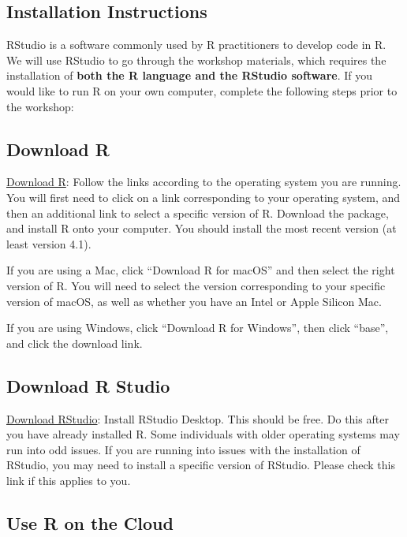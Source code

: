 \documentclass[
]{article}
\begin{document}
\hypertarget{installation-instructions}{%
\subsection{Installation Instructions}\label{installation-instructions}}

RStudio is a software commonly used by R practitioners to develop code
in R. We will use RStudio to go through the workshop materials, which
requires the installation of \textbf{both the R language and the RStudio
software}. If you would like to run R on your own computer, complete the
following steps prior to the workshop:

\hypertarget{download-r}{%
\subsection{Download R}\label{download-r}}

\href{https://cloud.r-project.org/}{Download R}: Follow the links
according to the operating system you are running. You will first need
to click on a link corresponding to your operating system, and then an
additional link to select a specific version of R. Download the package,
and install R onto your computer. You should install the most recent
version (at least version 4.1).

If you are using a Mac, click ``Download R for macOS'' and then select
the right version of R. You will need to select the version
corresponding to your specific version of macOS, as well as whether you
have an Intel or Apple Silicon Mac.

If you are using Windows, click ``Download R for Windows'', then click
``base'', and click the download link.

\hypertarget{download-r-studio}{%
\subsection{Download R Studio}\label{download-r-studio}}

\href{https://posit.co/download/rstudio-desktop/\#download}{Download
RStudio}: Install RStudio Desktop. This should be free. Do this after
you have already installed R. Some individuals with older operating
systems may run into odd issues. If you are running into issues with the
installation of RStudio, you may need to install a specific version of
RStudio. Please check this link if this applies to you.

\hypertarget{use-r-on-the-cloud}{%
\subsection{Use R on the Cloud}\label{use-r-on-the-cloud}}
\end{document}
